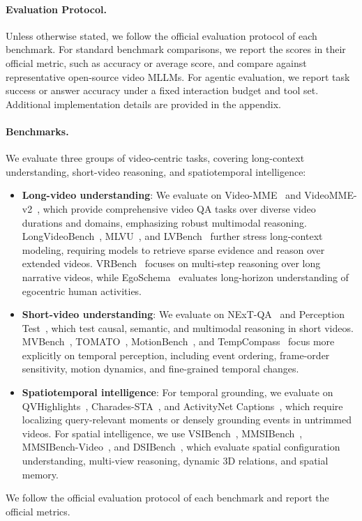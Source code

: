 \documentclass[11pt, letterpaper]{template}
\theoremstyle{plain}
\theoremstyle{definition}
\theoremstyle{remark}
\begin{document}
\paragraph{Evaluation Protocol.}
Unless otherwise stated, we follow the official evaluation protocol of each benchmark. For standard benchmark comparisons, we report the scores in their official metric, such as accuracy or average score, and compare against representative open-source video MLLMs. For agentic evaluation, we report task success or answer accuracy under a fixed interaction budget and tool set. Additional implementation details are provided in the appendix.


\paragraph{Benchmarks.}
We evaluate three groups of video-centric tasks, covering long-context understanding, short-video reasoning, and spatiotemporal intelligence:
\begin{itemize}[leftmargin=*]
\item \textbf{Long-video understanding}: We evaluate on Video-MME~\citep{videomme} and VideoMME-v2~\citep{fu2026video}, which provide comprehensive video QA tasks over diverse video durations and domains, emphasizing robust multimodal reasoning. LongVideoBench~\citep{longvideobench}, MLVU~\citep{mlvu}, and LVBench~\citep{wang2024lvbench} further stress long-context modeling, requiring models to retrieve sparse evidence and reason over extended videos. VRBench~\citep{yu2025vrbench} focuses on multi-step reasoning over long narrative videos, while EgoSchema~\citep{egoschema} evaluates long-horizon understanding of egocentric human activities.

\item \textbf{Short-video understanding}: We evaluate on NExT-QA~\citep{xiao2021next} and Perception Test~\citep{perceptiontest}, which test causal, semantic, and multimodal reasoning in short videos. MVBench~\citep{mvbench}, TOMATO~\citep{shangguan2025tomato}, MotionBench~\citep{hong2025motionbench}, and TempCompass~\citep{liu2024tempcompass} focus more explicitly on temporal perception, including event ordering, frame-order sensitivity, motion dynamics, and fine-grained temporal changes.

\item \textbf{Spatiotemporal intelligence}: For temporal grounding, we evaluate on QVHighlights~\citep{qvhighlight}, Charades-STA~\citep{charades-sta}, and ActivityNet Captions~\citep{caba2015activitynet}, which require localizing query-relevant moments or densely grounding events in untrimmed videos. For spatial intelligence, we use VSIBench~\citep{yang2025thinking}, MMSIBench~\citep{yang2025mmsi}, MMSIBench-Video~\citep{lin2025mmsi}, and DSIBench~\citep{zhang2025dsi}, which evaluate spatial configuration understanding, multi-view reasoning, dynamic 3D relations, and spatial memory.
\end{itemize}
We follow the official evaluation protocol of each benchmark and report the official metrics.
\end{document}
